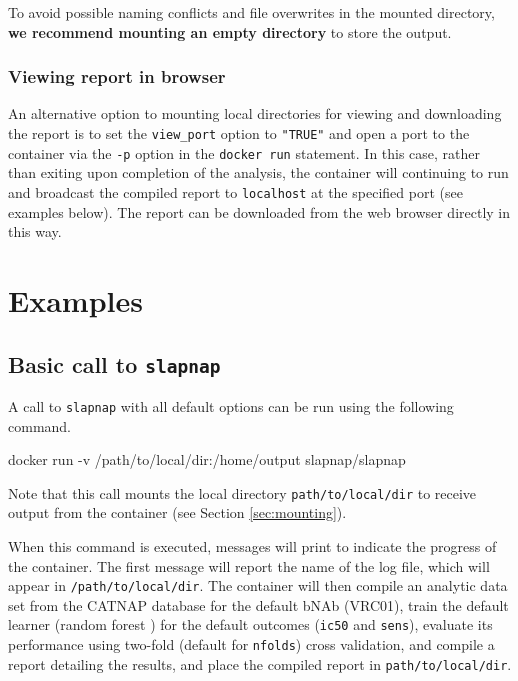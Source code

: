 \documentclass[]{article}
\newenvironment{Shaded}{\begin{snugshade}}{\end{snugshade}}
\newcommand{\ExtensionTok}[1]{#1}
\newcommand{\NormalTok}[1]{#1}
\begin{document}
To avoid possible naming conflicts and file overwrites in the mounted
directory, \textbf{we recommend mounting an empty directory} to store
the output.

\subsubsection{Viewing report in browser}\label{sec:viewreport}

An alternative option to mounting local directories for viewing and
downloading the report is to set the \texttt{view\_port} option to
\texttt{"TRUE"} and open a port to the container via the \texttt{-p}
option in the \texttt{docker\ run} statement. In this case, rather than
exiting upon completion of the analysis, the container will continuing
to run and broadcast the compiled report to \texttt{localhost} at the
specified port (see examples below). The report can be downloaded from
the web browser directly in this way.

\section{Examples}\label{sec:examples}

\subsection{\texorpdfstring{Basic call to
\texttt{slapnap}}{Basic call to slapnap}}\label{basic-call-to-slapnap}

A call to \texttt{slapnap} with all default options can be run using the
following command.

\begin{Shaded}
\begin{Highlighting}[]
\ExtensionTok{docker}\NormalTok{ run -v /path/to/local/dir:/home/output slapnap/slapnap}
\end{Highlighting}
\end{Shaded}

Note that this call mounts the local directory
\texttt{path/to/local/dir} to receive output from the container (see
Section \ref{sec:mounting}).

When this command is executed, messages will print to indicate the
progress of the container. The first message will report the name of the
log file, which will appear in \texttt{/path/to/local/dir}. The
container will then compile an analytic data set from the CATNAP
database for the default bNAb (VRC01), train the default learner (random
forest \citep{breiman2001}) for the default outcomes (\texttt{ic50} and
\texttt{sens}), evaluate its performance using two-fold (default for
\texttt{nfolds}) cross validation, and compile a report detailing the
results, and place the compiled report in \texttt{path/to/local/dir}.
\end{document}
